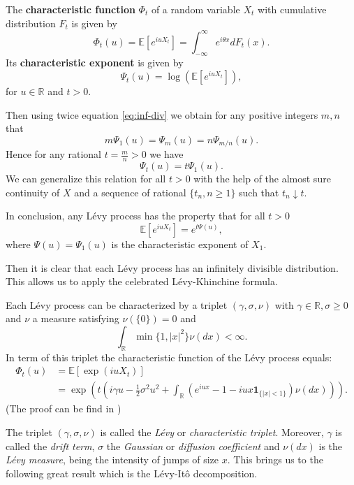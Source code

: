 \begin{defn}\label{def:Levy:CF_CE}
The \textbf{characteristic function} $\Phi_t$ of a random variable $X_t$ with cumulative distribution $F_t$ is given by
$$\Phi_t(u) = \mathbb{E}\left[e^{iu X_t}\right]=\int_{-\infty}^{\infty}e^{i\theta x}dF_t(x).$$
Its \textbf{characteristic exponent} is given by
$$\Psi_t(u) = \log\left(\mathbb{E}\left[e^{iu X_t}\right]\right),$$
for $u \in\mathbb{R}$ and $t>0$.
\end{defn}

 Then using twice equation \eqref{eq:inf-div} we obtain for any positive integers $m,n$ that
$$m\Psi_1(u) = \Psi_m(u) = n \Psi_{m/n}(u).$$
Hence for any rational $t=\frac{m}{n}>0$ we have
$$\Psi_t(u) = t\Psi_1(u).$$
We can generalize this relation for all $t>0$ with the help of the almost sure continuity of $X$ and a sequence of rational $\{t_n, n\geq 1\}$ such that $t_n\downarrow t$.

In conclusion, any L\'evy process has the property that for all $t>0$
$$\mathbb{E}\left[e^{iu X_t}\right] = e^{t\Psi(u)},$$
where $\Psi(u) = \Psi_1(u)$ is the characteristic exponent of $X_1$.

Then it is clear that each L\'evy process has an infinitely divisible distribution. This allows us to apply the celebrated L\'evy-Khinchine formula. 

\begin{thm}\label{thm:Levy:LK}
Each L\'evy process can be characterized by a triplet $(\gamma,\sigma,\nu)$ with $\gamma \in \mathbb{R},\sigma \geq 0$ and $\nu$ a measure satisfying $\nu(\{0\}) = 0$ and
$$\int_\mathbb{R} \min\{1,|x|^2\}\nu(dx)<\infty.$$
In term of this triplet the characteristic function of the L\'evy process equals:
\begin{align}\label{eq:LK}
\Phi_t(u) &= \mathbb{E}\left[\exp(i u X_t)\right]\nonumber\\
&= \exp\left(t\left(i\gamma u -\frac{1}{2}\sigma^2u^2+\int_\mathbb{R}\left(e^{iux}-1-iux\mathbf{1}_{\{|x|<1\}}\right)\nu(dx)\right)\right).
\end{align}
(The proof can be find in \citeauthor{TC03} \citeyearpar{TC03})
\end{thm}

The triplet $(\gamma,\sigma,\nu)$ is called the \textit{L\'evy} or \textit{characteristic triplet}. Moreover, $\gamma$ is called the \textit{drift term}, $\sigma$ the \textit{Gaussian} or \textit{diffusion coefficient} and $\nu(dx)$ is the \textit{L\'evy measure}, being the intensity of jumps of size $x$. This brings us to the following great result which is the L\'evy-Itô decomposition.


